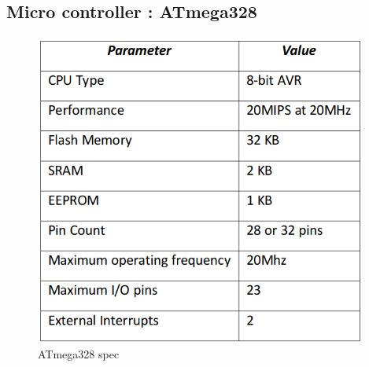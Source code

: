     \subsection{Micro controller : ATmega328}
    \begin{figure}
        \centering
        \includegraphics[width=4.3in]{Images/Intro_Arduino/mega328_spec.png}
        \caption{ATmega328 spec}
    \end{figure}

